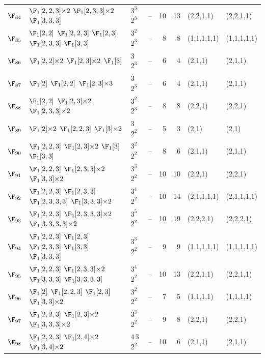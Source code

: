\begin{landscape}
{\begin{longtable}{@{}l p{8.2cm} l l r r l l@{}}
$\F_{84}$ & $\F_{1}[2,2,3]{\times}2$\; $\F_{1}[2,3,3]{\times}2$\; $\F_{1}[3,3,3]$ & $3^{3}$\,$2^{3}$ & -- & 10 & 13 & (2,2,1,1) & (2,2,1,1) \\
$\F_{85}$ & $\F_{1}[2,2]$\; $\F_{1}[2,2,3]$\; $\F_{1}[2,3]$\; $\F_{1}[2,3,3]$\; $\F_{1}[3,3]$ & $3^{2}$\,$2^{3}$ & -- & 8 & 8 & (1,1,1,1,1) & (1,1,1,1,1) \\
$\F_{86}$ & $\F_{1}[2,2]{\times}2$\; $\F_{1}[2,3]{\times}2$\; $\F_{1}[3]$ & $3$\,$2^{3}$ & -- & 6 & 4 & (2,1,1) & (2,1,1) \\
$\F_{87}$ & $\F_{1}[2]$\; $\F_{1}[2,2]$\; $\F_{1}[2,3]{\times}3$ & $3$\,$2^{3}$ & -- & 6 & 4 & (2,1,1) & (2,1,1) \\
$\F_{88}$ & $\F_{1}[2,2]$\; $\F_{1}[2,3]{\times}2$\; $\F_{1}[2,3,3]{\times}2$ & $3^{2}$\,$2^{3}$ & -- & 8 & 8 & (2,2,1) & (2,2,1) \\
$\F_{89}$ & $\F_{1}[2]{\times}2$\; $\F_{1}[2,2,3]$\; $\F_{1}[3]{\times}2$ & $3$\,$2^{2}$ & -- & 5 & 3 & (2,1) & (2,1) \\
$\F_{90}$ & $\F_{1}[2,2,3]$\; $\F_{1}[2,3]{\times}2$\; $\F_{1}[3]$\; $\F_{1}[3,3]$ & $3^{2}$\,$2^{2}$ & -- & 8 & 6 & (2,1,1) & (2,1,1) \\
$\F_{91}$ & $\F_{1}[2,2,3]$\; $\F_{1}[2,3,3]{\times}2$\; $\F_{1}[3,3]{\times}2$ & $3^{3}$\,$2^{2}$ & -- & 10 & 10 & (2,2,1) & (2,2,1) \\
$\F_{92}$ & $\F_{1}[2,2,3]$\; $\F_{1}[2,3,3]$\; $\F_{1}[2,3,3,3]$\; $\F_{1}[3,3,3]{\times}2$ & $3^{4}$\,$2^{2}$ & -- & 10 & 14 & (2,1,1,1,1) & (2,1,1,1,1) \\
$\F_{93}$ & $\F_{1}[2,2,3]$\; $\F_{1}[2,3,3,3]{\times}2$\; $\F_{1}[3,3,3,3]{\times}2$ & $3^{5}$\,$2^{2}$ & -- & 10 & 19 & (2,2,2,1) & (2,2,2,1) \\
$\F_{94}$ & $\F_{1}[2,2,3]$\; $\F_{1}[2,3]$\; $\F_{1}[2,3,3]$\; $\F_{1}[3,3]$\; $\F_{1}[3,3,3]$ & $3^{3}$\,$2^{2}$ & -- & 9 & 9 & (1,1,1,1,1) & (1,1,1,1,1) \\
$\F_{95}$ & $\F_{1}[2,2,3]$\; $\F_{1}[2,3,3]{\times}2$\; $\F_{1}[3,3,3]$\; $\F_{1}[3,3,3,3]$ & $3^{4}$\,$2^{2}$ & -- & 10 & 13 & (2,2,1,1) & (2,2,1,1) \\
$\F_{96}$ & $\F_{1}[2]$\; $\F_{1}[2,2,3]$\; $\F_{1}[2,3]$\; $\F_{1}[3,3]{\times}2$ & $3^{2}$\,$2^{2}$ & -- & 7 & 5 & (1,1,1,1) & (1,1,1,1) \\
$\F_{97}$ & $\F_{1}[2,2,3]$\; $\F_{1}[2,3]{\times}2$\; $\F_{1}[3,3,3]{\times}2$ & $3^{3}$\,$2^{2}$ & -- & 9 & 8 & (2,2,1) & (2,2,1) \\
$\F_{98}$ & $\F_{1}[2,2,3]$\; $\F_{1}[2,4]{\times}2$\; $\F_{1}[3,4]{\times}2$ & $4$\,$3$\,$2^{2}$ & -- & 10 & 6 & (2,1,1) & (2,1,1) \\

\end{longtable}}
\end{landscape}
